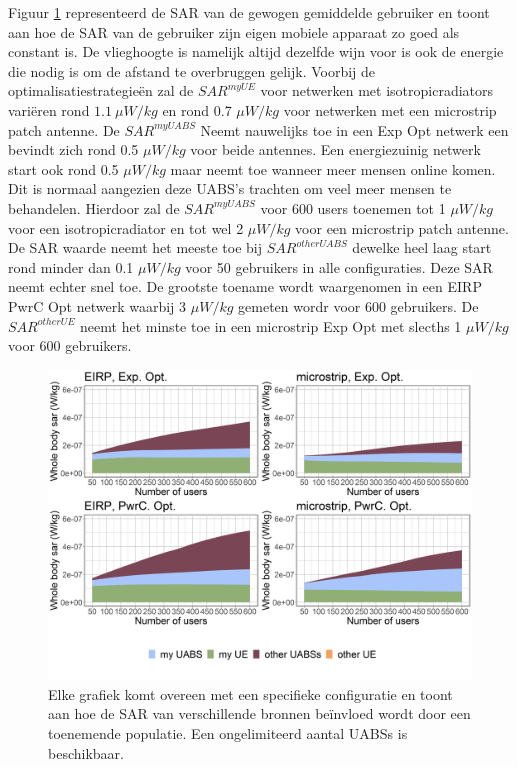 \documentclass[twocolumn]{phdsymp_dutch}
\begin{document}
Figuur \ref{fig:s3b_fourSourcesMatrix} representeerd de  
\gls{SAR} van de gewogen gemiddelde gebruiker en toont aan hoe de 
\gls{SAR} van de gebruiker zijn eigen mobiele apparaat zo goed als constant is.
De vlieghoogte is namelijk altijd dezelfde wijn voor is ook de energie die nodig is om de afstand te overbruggen gelijk.
Voorbij de optimalisatiestrategie\"en zal de
 $SAR^{myUE}$ voor netwerken met  \gls{isotropicradiator}s vari\"eren rond $1.1\ \mu W/kg$  %
 en rond 0.7 $\mu W/kg$ voor netwerken met een microstrip patch antenne.
De $SAR^{myUABS}$ Neemt nauwelijks toe in een \gls{Exp Opt} netwerk een bevindt zich rond 0.5 $\mu W/kg$ voor beide antennes.
Een energiezuinig netwerk start ook rond
 0.5 $\mu W/kg$ maar neemt toe wanneer meer mensen online komen.
Dit is normaal aangezien deze \gls{UABS}'s trachten om veel meer mensen te behandelen.
Hierdoor zal de $SAR^{myUABS}$ 
voor 600 users toenemen tot 1 $\mu W/kg$ voor een \gls{isotropicradiator} en tot wel 2 $\mu W/kg$ voor een microstrip patch antenne.
De \gls{SAR} waarde neemt het meeste toe bij $SAR^{otherUABS}$ dewelke heel laag start rond minder  dan  
0.1 $\mu W/kg$ voor 50 gebruikers in alle configuraties. 
Deze \gls{SAR} neemt echter snel toe. De grootste toename wordt waargenomen in een 
\gls{EIRP} \gls{PwrC Opt} netwerk 
waarbij 3 $\mu W/kg$ gemeten wordr voor 600 gebruikers. De $SAR^{otherUE}$ neemt het minste toe in een microstrip \gls{Exp Opt} met 
slecths 1 $\mu W/kg$ voor 600 gebruikers.
\begin{figure}[h!]
  \includegraphics[width=\linewidth]{../results/s3/uFourSources.png}
  \caption{Elke grafiek komt overeen met een specifieke configuratie en toont aan hoe de \acs{SAR} 
  van verschillende bronnen be\"invloed wordt door een toenemende populatie. Een ongelimiteerd aantal \acs{UABS}s is beschikbaar.
}
  \label{fig:s3b_fourSourcesMatrix}
\end{figure}
\end{document}
